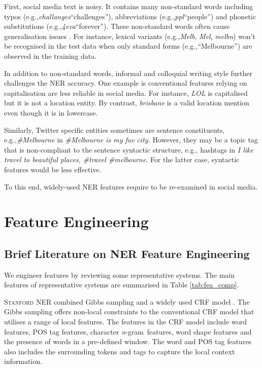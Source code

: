 \documentclass[11pt]{article}
\newcommand{\eg}{e.g.,\xspace}
\newcommand{\mygl}[1]{``#1''}
\newcommand{\myex}[1]{\textit{#1}}
\newcommand{\lexpair}[2]{\myex{#1}\xspace\mygl{#2}}
\newcommand{\ngram}{\textit{n}-gram\ }
\newcommand{\stanford}{\textsc{Stanford}\xspace}
\newcommand{\tabref}[2][]{Table#1 \ref{#2}}
\begin{document}
First, social media text is noisy.
It contains many non-standard words including typos (\eg \lexpair{challanges}{challenges}), abbreviations (\eg \lexpair{ppl}{people}) and phonetic substitutions (\eg \lexpair{4eva}{forever}).
These non-standard words often cause generalisation issues \cite{acl11han}.
For instance, lexical variants (\eg \myex{Melb}, \myex{Mel}, \myex{melbn}) won't be recognised in the test data when only standard forms (\eg \mygl{Melbourne}) are observed in the training data.

In addition to non-standard words, informal and colloquial writing style further challenges the NER accuracy.
One example is conventional features relying on capitalisation are less reliable in social media.
For instance, \myex{LOL} is capitalised but it is not a location entity.
By contrast, \myex{brisbane} is a valid location mention even though it is in lowercase.

Similarly, Twitter specific entities sometimes are sentence constituents, \eg \myex{\#Melbourne} in \myex{\#Melbourne is my fav city.}
However, they may be a topic tag that is non-compliant to the sentence syntactic structure, \eg hashtags in \myex{I like travel to beautiful places, \#travel \#melbourne}.
For the latter case, syntactic features would be less effective.

To this end, widely-used NER features require to be re-examined in social media.

\section{Feature Engineering}
\label{sec:feature}

\subsection{Brief Literature on NER Feature Engineering}
\label{sec:literature}
We engineer features by reviewing some representative systems.
The main features of representative systems are summarised in \tabref{tab:fea_comp}.

\stanford NER combined Gibbs sampling and a widely used CRF model \cite{acl05fink}.
The Gibbs sampling offers non-local constraints to the conventional CRF model that utilises a range of local features.
The features in the CRF model include word features, POS tag features, character \ngram features, word shape features and the presence of words in a pre-defined window.
The word and POS tag features also includes the surrounding tokens and tags to capture the local context information.
\end{document}
